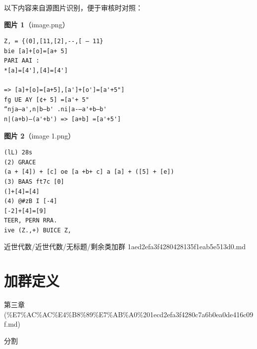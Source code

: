 \begin{note}
以下内容来自源图片识别，便于审核时对照：

\textbf{图片 1}（image.png）
\begin{Verbatim}[fontsize=\small]
Z, = {(0],[11,[2],--,[ — 11}
bie [a]+[o]=[a+ 5]
PARI AAI :
*[a]=[4'],[4]=[4']

=> [a]+[o]=[a+5],[a']+[o']=[a'+5"]
fg UE AY [¢+ 5] =[a'+ 5"
“nja—a',n|b—b' .ni|a-—a'+b—b'
n|(a+b)—(a'+b') => [a+b] =[a'+5']
\end{Verbatim}

\textbf{图片 2}（image 1.png）
\begin{Verbatim}[fontsize=\small]
(lL) 28s
(2) GRACE
(a + [4]) + [c] oe [a +b+ c] a [a] + ([5] + [e])
(3) BAAS ft7c [0]
(]+[4]=[4]
(4) @#zB I [-4]
[-2]+[4]=[9]
TEER, PERN RRA.
ive (Z.,+) BUICE Z,
\end{Verbatim}

\end{note}

\begin{note}[来源路径]

近世代数/近世代数/无标题/剩余类加群 1aed2efa3f4280428135f1eab5e513d0.md

\end{note}

\section*{加群定义}

\begin{note}[来源上级主题]

第三章 (\%E7\%AC\%AC\%E4\%B8\%89\%E7\%AB\%A0\%201ecd2efa3f4280c7a6b0ea0de416c09f.md)

\end{note}

\begin{definition}[加群定义]

分割

\end{definition}


